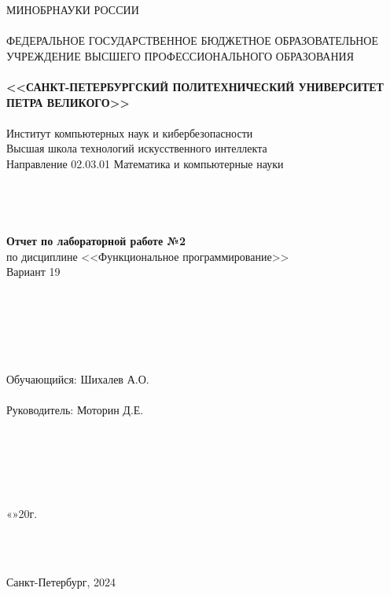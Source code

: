 \documentclass[11pt,a4paper,final]{article} %
\begin{document}
	
\thispagestyle{empty}

\begin{center}
	{\Large МИНОБРНАУКИ РОССИИ}\\
	~\\
	{\large ФЕДЕРАЛЬНОЕ ГОСУДАРСТВЕННОЕ БЮДЖЕТНОЕ ОБРАЗОВАТЕЛЬНОЕ УЧРЕЖДЕНИЕ ВЫСШЕГО ПРОФЕССИОНАЛЬНОГО ОБРАЗОВАНИЯ}\\
	~\\
	{\Large \bf <<САНКТ-ПЕТЕРБУРГСКИЙ ПОЛИТЕХНИЧЕСКИЙ УНИВЕРСИТЕТ ПЕТРА ВЕЛИКОГО>>}\\
	~\\
	{\large Институт компьютерных наук и кибербезопасности }\\
	{\large Высшая школа технологий искусственного интеллекта}\\
	{\large Направление 02.03.01 Математика и компьютерные науки}\\
	~\\
	~\\
	~\\
	~\\
	{\Large \bf  Отчет по лабораторной работе №2 }\\
	\vspace{3mm}
	{\Large {по дисциплине <<Функциональное программирование>>}}\\
	\vspace{3mm}
	{\Large {Вариант 19}}\\
	~\\
	~\\
	~\\
	~\\
	~\\
	~\\
	{\large Обучающийся: \underline{\hspace{3.5cm}} \hspace{12mm} Шихалев А.О.}\\
	~\\
	{\large Руководитель: \underline{\hspace{3.5cm}} \hspace{12mm} Моторин Д.Е.}\\
	~\\
	~\\
	~\\
	~\\
	~\\
\end{center}
\begin{flushright}
	
	«\underline{\hspace{1cm}}»\underline{\hspace{3cm}}20\underline{\hspace{0.7cm}}г.
\end{flushright}
~\\
~\\
\begin{center}
	{\large Санкт-Петербург, 2024}
\end{center}
\end{document}
